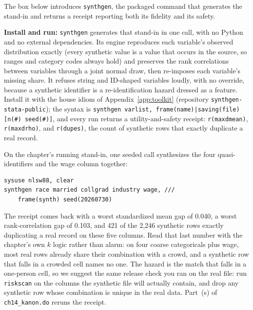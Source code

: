 \documentclass[
    a4paper,
    fontsize=10pt,
    twoside=true,
    numbers=noenddot,
]{kaobook}
\begin{document}
The box below introduces \texttt{synthgen}, the packaged command that generates the stand-in and returns a receipt reporting both its fidelity and its safety.

\begin{kaobox}[frametitle=Package Integration: \texttt{synthgen}]
\textbf{Install and run:} \texttt{synthgen} generates that stand-in in one call, with no Python and no external dependencies. Its engine reproduces each variable's observed distribution exactly (every synthetic value is a value that occurs in the source, so ranges and category codes always hold) and preserves the rank correlations between variables through a joint normal draw, then re-imposes each variable's missing share. It refuses string and ID-shaped variables loudly, with no override, because a synthetic identifier is a re-identification hazard dressed as a feature. Install it with the house idiom of Appendix~\ref{app:toolkit} (repository \texttt{synthgen-stata-public}); the syntax is \texttt{synthgen varlist, frame(name)|saving(file) [n(\#) seed(\#)]}, and every run returns a utility-and-safety receipt: \texttt{r(maxdmean)}, \texttt{r(maxdrho)}, and \texttt{r(dupes)}, the count of synthetic rows that exactly duplicate a real record.
\end{kaobox}

On the chapter's running stand-in, one seeded call synthesizes the four quasi-identifiers and the wage column together:
\par
{\footnotesize
\begin{verbatim}
sysuse nlsw88, clear
synthgen race married collgrad industry wage, ///
    frame(synth) seed(20260730)
\end{verbatim}
}
The receipt comes back with a worst standardized mean gap of 0.040, a worst rank-correlation gap of 0.103, and 421 of the 2{,}246 synthetic rows exactly duplicating a real record on these five columns. Read that last number with the chapter's own $k$ logic rather than alarm: on four coarse categoricals plus wage, most real rows already share their combination with a crowd, and a synthetic row that falls in a crowded cell names no one. The hazard is the match that falls in a one-person cell, so we suggest the same release check you ran on the real file: run \texttt{riskscan} on the columns the synthetic file will actually contain, and drop any synthetic row whose combination is unique in the real data. Part~(s) of \texttt{ch14\_kanon.do} reruns the receipt.
\end{document}
